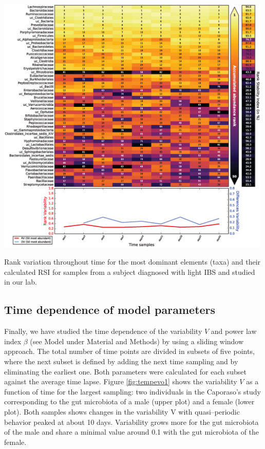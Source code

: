 \begin{supfig}
	\centering
	\includegraphics[width=0.99\textwidth]{figs/supfig_corrank_IBS_P1.eps}
	\caption{Rank variation throughout time for the most dominant elements (taxa) and their calculated RSI for samples from a subject diagnosed with light IBS and studied in our lab\cite{IBS}.}
	\label{supfig:corrank_IBS_P1}
\end{supfig}

\subsection*{Time dependence of model parameters}

Finally, we have studied the time dependence of the variability $V$ and power law index $\beta$ (see Model under Material and Methods) by using a sliding window approach. The total number of time points are divided in subsets of five points, where the next subset is defined by adding the next time sampling and by eliminating the earliest one. Both parameters were calculated for each subset against the average time lapse. Figure \ref{fig:tempevo1} shows the variability  $V$ as a function of time for the largest sampling: two individuals in the Caporaso's study\cite{moving} corresponding to the gut microbiota of a male (upper plot) and a female (lower plot). Both samples shows changes in the variability V with quasi--periodic behavior peaked at about 10 days. Variability grows more for the gut microbiota of the male and share a minimal value around 0.1 with the gut microbiota of the female. 


